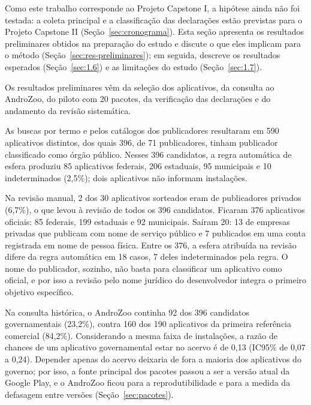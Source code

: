 \label{sec:resultados}

Como este trabalho corresponde ao Projeto Capstone I, a hipótese ainda não foi testada: a coleta principal e a classificação das declarações estão previstas para o Projeto Capstone II (Seção~\ref{sec:cronograma}). Esta seção apresenta os resultados preliminares obtidos na preparação do estudo e discute o que eles implicam para o método (Seção~\ref{sec:res-preliminares}); em seguida, descreve os resultados esperados (Seção~\ref{sec:1.6}) e as limitações do estudo (Seção~\ref{sec:1.7}).

\label{sec:res-preliminares}

Os resultados preliminares vêm da seleção dos aplicativos, da consulta ao AndroZoo, do piloto com 20 pacotes, da verificação das declarações e do andamento da revisão sistemática.

\label{sec:res-selecao}

As buscas por termo e pelos catálogos dos publicadores resultaram em 590 aplicativos distintos, dos quais 396, de 71 publicadores, tinham publicador classificado como órgão público. Nesses 396 candidatos, a regra automática de esfera produziu 85 aplicativos federais, 206 estaduais, 95 municipais e 10 indeterminados (2,5\%); dois aplicativos não informam instalações.

Na revisão manual, 2 dos 30 aplicativos sorteados eram de publicadores privados (6,7\%), o que levou à revisão de todos os 396 candidatos. Ficaram 376 aplicativos oficiais: 85 federais, 199 estaduais e 92 municipais. Saíram 20: 13 de empresas privadas que publicam com nome de serviço público e 7 publicados em uma conta registrada em nome de pessoa física. Entre os 376, a esfera atribuída na revisão difere da regra automática em 18 casos, 7 deles indeterminados pela regra. O nome do publicador, sozinho, não basta para classificar um aplicativo como oficial, e por isso a revisão pelo nome jurídico do desenvolvedor integra o primeiro objetivo específico.

\label{sec:res-androzoo}

Na consulta histórica, o AndroZoo continha 92 dos 396 candidatos governamentais (23,2\%), contra 160 dos 190 aplicativos da primeira referência comercial (84,2\%). Considerando a mesma faixa de instalações, a razão de chances de um aplicativo governamental estar no acervo é de 0,13 (IC95\% de 0,07 a 0,24). Depender apenas do acervo deixaria de fora a maioria dos aplicativos do governo; por isso, a fonte principal dos pacotes passou a ser a versão atual da Google Play, e o AndroZoo ficou para a reprodutibilidade e para a medida da defasagem entre versões (Seção~\ref{sec:pacotes}).

